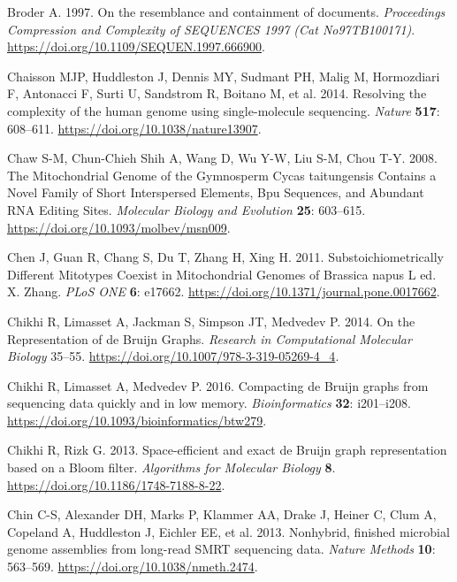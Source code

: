 \documentclass[
  12pt,
  oneside,
  openany]{book}
\begin{document}
\leavevmode\hypertarget{ref-Broder_1997}{}%
Broder A. 1997. On the resemblance and containment of documents. \emph{Proceedings Compression and Complexity of SEQUENCES 1997 (Cat No97TB100171)}. \url{https://doi.org/10.1109/SEQUEN.1997.666900}.

\leavevmode\hypertarget{ref-Chaisson_2014}{}%
Chaisson MJP, Huddleston J, Dennis MY, Sudmant PH, Malig M, Hormozdiari F, Antonacci F, Surti U, Sandstrom R, Boitano M, et al. 2014. Resolving the complexity of the human genome using single-molecule sequencing. \emph{Nature} \textbf{517}: 608--611. \url{https://doi.org/10.1038/nature13907}.

\leavevmode\hypertarget{ref-Chaw_2008}{}%
Chaw S-M, Chun-Chieh Shih A, Wang D, Wu Y-W, Liu S-M, Chou T-Y. 2008. The Mitochondrial Genome of the Gymnosperm Cycas taitungensis Contains a Novel Family of Short Interspersed Elements, Bpu Sequences, and Abundant RNA Editing Sites. \emph{Molecular Biology and Evolution} \textbf{25}: 603--615. \url{https://doi.org/10.1093/molbev/msn009}.

\leavevmode\hypertarget{ref-Chen_2011}{}%
Chen J, Guan R, Chang S, Du T, Zhang H, Xing H. 2011. Substoichiometrically Different Mitotypes Coexist in Mitochondrial Genomes of Brassica napus L ed. X. Zhang. \emph{PLoS ONE} \textbf{6}: e17662. \url{https://doi.org/10.1371/journal.pone.0017662}.

\leavevmode\hypertarget{ref-Chikhi_2014}{}%
Chikhi R, Limasset A, Jackman S, Simpson JT, Medvedev P. 2014. On the Representation of de Bruijn Graphs. \emph{Research in Computational Molecular Biology} 35--55. \url{https://doi.org/10.1007/978-3-319-05269-4_4}.

\leavevmode\hypertarget{ref-Chikhi_2016}{}%
Chikhi R, Limasset A, Medvedev P. 2016. Compacting de Bruijn graphs from sequencing data quickly and in low memory. \emph{Bioinformatics} \textbf{32}: i201--i208. \url{https://doi.org/10.1093/bioinformatics/btw279}.

\leavevmode\hypertarget{ref-Chikhi_2013}{}%
Chikhi R, Rizk G. 2013. Space-efficient and exact de Bruijn graph representation based on a Bloom filter. \emph{Algorithms for Molecular Biology} \textbf{8}. \url{https://doi.org/10.1186/1748-7188-8-22}.

\leavevmode\hypertarget{ref-Chin_2013}{}%
Chin C-S, Alexander DH, Marks P, Klammer AA, Drake J, Heiner C, Clum A, Copeland A, Huddleston J, Eichler EE, et al. 2013. Nonhybrid, finished microbial genome assemblies from long-read SMRT sequencing data. \emph{Nature Methods} \textbf{10}: 563--569. \url{https://doi.org/10.1038/nmeth.2474}.
\end{document}
